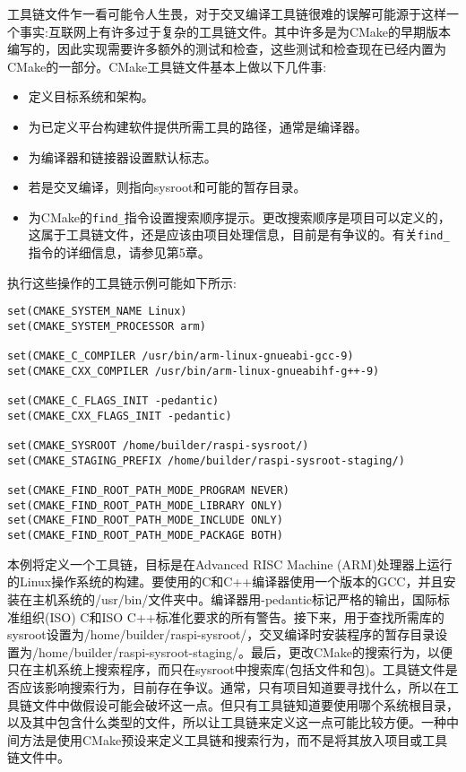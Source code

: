 
工具链文件乍一看可能令人生畏，对于交叉编译工具链很难的误解可能源于这样一个事实:互联网上有许多过于复杂的工具链文件。其中许多是为CMake的早期版本编写的，因此实现需要许多额外的测试和检查，这些测试和检查现在已经内置为CMake的一部分。CMake工具链文件基本上做以下几件事:

\begin{itemize}
\item 
定义目标系统和架构。

\item 
为已定义平台构建软件提供所需工具的路径，通常是编译器。

\item 
为编译器和链接器设置默认标志。

\item 
若是交叉编译，则指向sysroot和可能的暂存目录。

\item 
为CMake的\texttt{find\_}指令设置搜索顺序提示。更改搜索顺序是项目可以定义的，这属于工具链文件，还是应该由项目处理信息，目前是有争议的。有关\texttt{find\_}指令的详细信息，请参见第5章。
\end{itemize}

执行这些操作的工具链示例可能如下所示:

\begin{lstlisting}[style=styleCMake]
set(CMAKE_SYSTEM_NAME Linux)
set(CMAKE_SYSTEM_PROCESSOR arm)

set(CMAKE_C_COMPILER /usr/bin/arm-linux-gnueabi-gcc-9)
set(CMAKE_CXX_COMPILER /usr/bin/arm-linux-gnueabihf-g++-9)

set(CMAKE_C_FLAGS_INIT -pedantic)
set(CMAKE_CXX_FLAGS_INIT -pedantic)

set(CMAKE_SYSROOT /home/builder/raspi-sysroot/)
set(CMAKE_STAGING_PREFIX /home/builder/raspi-sysroot-staging/)

set(CMAKE_FIND_ROOT_PATH_MODE_PROGRAM NEVER)
set(CMAKE_FIND_ROOT_PATH_MODE_LIBRARY ONLY)
set(CMAKE_FIND_ROOT_PATH_MODE_INCLUDE ONLY)
set(CMAKE_FIND_ROOT_PATH_MODE_PACKAGE BOTH)
\end{lstlisting}

本例将定义一个工具链，目标是在Advanced RISC Machine (ARM)处理器上运行的Linux操作系统的构建。要使用的C和C++编译器使用一个版本的GCC，并且安装在主机系统的/usr/bin/文件夹中。编译器用-pedantic标记严格的输出，国际标准组织(ISO) C和ISO C++标准化要求的所有警告。接下来，用于查找所需库的sysroot设置为/home/builder/raspi-sysroot/，交叉编译时安装程序的暂存目录设置为/home/builder/raspi-sysroot-staging/。最后，更改CMake的搜索行为，以便只在主机系统上搜索程序，而只在sysroot中搜索库(包括文件和包)。工具链文件是否应该影响搜索行为，目前存在争议。通常，只有项目知道要寻找什么，所以在工具链文件中做假设可能会破坏这一点。但只有工具链知道要使用哪个系统根目录，以及其中包含什么类型的文件，所以让工具链来定义这一点可能比较方便。一种中间方法是使用CMake预设来定义工具链和搜索行为，而不是将其放入项目或工具链文件中。

